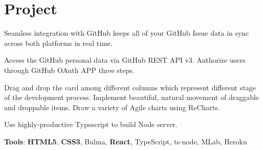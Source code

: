 \documentclass[letterpaper]{deedy-resume} %
\begin{document}
\begin{minipage}[t]{0.66\textwidth}
\begin{tightitemize}
\end{tightitemize}
\sectionspace
\section{Project}

\vspace{\topsep} %
\begin{tightitemize}
	\item Seamless integration with GitHub keeps all of your GitHub Issue data in sync across both platforms in real time.
	\item Access the GitHub personal data via GitHub REST API v3. Authorize users through GitHub OAuth APP three steps.
	\item Drag and drop the card among different columns which represent different stage of the development process. Implement beautiful, natural movement of draggable and droppable items. Draw a variety of Agile charts using ReCharts.
	\item Use highly-productive Typescript to build Node server.
	\item \textbf{Tools}: \textbf{HTML5}, \textbf{CSS3}, Bulma, \textbf{React}, TypeScript, ts-node, MLab, Heroku
\end{tightitemize}





\sectionspace %







\end{minipage}
\end{document}
